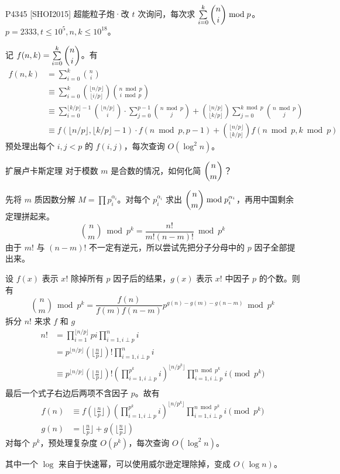 \documentclass [hyperref={bookmarksdepth=4}, aspectratio=169] {beamer}
\theoremstyle {fy}
\begin{document}
\begin{frame}{P4345 [SHOI2015] 超能粒子炮·改}
$t$ 次询问，每次求 $\sum\limits_{i=0}^k\dbinom{n}{i}\bmod p$。$p=2333,t\le 10^5,n,k\le 10^{18}$。

记 $f(n,k)=\sum\limits_{i=0}^k\dbinom{n}{i}$。有
$$
\begin{aligned}
f(n,k)&=\sum_{i=0}^k\binom{n}{i}\\
&\equiv\sum_{i=0}^k\binom{\lfloor n/p\rfloor}{\lfloor i/p\rfloor}\binom{n\bmod p}{i\bmod p}\\
&\equiv \sum_{i=0}^{\lfloor k/p\rfloor-1}\binom{\lfloor n/p\rfloor}{i}\cdot \sum_{j=0}^{p-1}\binom{n\bmod p}{j}+\binom{\lfloor n/p\rfloor}{\lfloor k/p\rfloor}\sum_{j=0}^{k\bmod p}\binom{n\bmod p}{j}\\
&\equiv f(\lfloor n/p\rfloor, \lfloor k/p\rfloor-1)\cdot f(n\bmod p,p-1)+\binom{\lfloor n/p\rfloor}{\lfloor k/p\rfloor}f(n\bmod p,k\bmod p)
\end{aligned}
$$
预处理出每个 $i,j<p$ 的 $f(i,j)$，每次查询 $O(\log^2 n)$。
\end{frame}

\begin{frame}{扩展卢卡斯定理}
对于模数 $m$ 是合数的情况，如何化简 $\dbinom{n}{m}$？

先将 $m$ 质因数分解 $M=\prod p_i^{\alpha_i}$。对每个 $p_i^{\alpha_i}$ 求出 $\dbinom{n}{m}\bmod p_i^{\alpha_i}$，再用中国剩余定理拼起来。
$$
\binom{n}{m}\bmod p^k=\frac{n!}{m!(n-m)!}\bmod p^k
$$
由于 $m!$ 与 $(n-m)!$ 不一定有逆元，所以尝试先把分子分母中的 $p$ 因子全部提出来。

设 $f(x)$ 表示 $x!$ 除掉所有 $p$ 因子后的结果，$g(x)$ 表示 $x!$ 中因子 $p$ 的个数。则有
$$
\binom{n}{m}\bmod p^k=\frac{f(n)}{f(m)f(n-m)}p^{g(n)-g(m)-g(n-m)}\bmod p^k
$$
拆分 $n!$ 来求 $f$ 和 $g$
$$
\begin{aligned}
n!&=\prod_{i=1}^{\lfloor n/p\rfloor}pi\prod_{i=1,i\perp p}^n i\\
&=p^{\lfloor n/p\rfloor}(\lfloor\frac{n}{p}\rfloor)!\prod_{i=1,i\perp p}^n i\\
&\equiv p^{\lfloor n/p\rfloor}(\lfloor\frac{n}{p}\rfloor)!(\prod_{i=1,i\perp p}^{p^k}i)^{\lfloor n/p^k\rfloor}\prod_{i=1,i\perp p}^{n\bmod p^k}i\pmod {p^k}\\
\end{aligned}
$$
最后一个式子右边后两项不含因子 $p$。故有
$$
\begin{aligned}
f(n)&\equiv f(\lfloor\frac{n}{p}\rfloor)(\prod_{i=1,i\perp p}^{p^k}i)^{\lfloor n/p^k\rfloor}\prod_{i=1,i\perp p}^{n\bmod p^k}i\pmod {p^k}\\
g(n)&=\lfloor\frac{n}{p}\rfloor+g(\lfloor\frac{n}{p}\rfloor)
\end{aligned}
$$
对每个 $p^k$，预处理复杂度 $O(p^k)$，每次查询 $O(\log^2 n)$。

其中一个 $\log$ 来自于快速幂，可以使用威尔逊定理除掉，变成 $O(\log n)$。
\end{frame}
\end{document}

